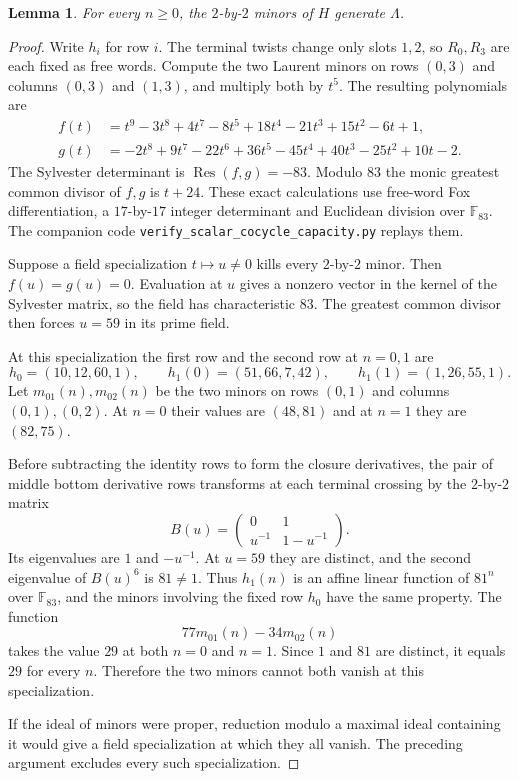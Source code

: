\documentclass[11pt]{article}
\newtheorem{lemma}[theorem]{Lemma}
\newcommand{\F}{\mathbb F}
\begin{document}
\begin{lemma}\label{lem:minors}
For every $n\ge0$, the $2$-by-$2$ minors of $H$ generate $\Lambda$.
\end{lemma}
\begin{proof}
Write $h_i$ for row $i$. The terminal twists change only slots $1,2$,
so $R_0,R_3$ are each fixed as free words. Compute the two Laurent
minors on rows $(0,3)$ and columns $(0,3)$ and $(1,3)$, and multiply
both by $t^5$. The resulting polynomials are
\begin{align*}
 f(t)&=t^9-3t^8+4t^7-8t^5+18t^4-21t^3+15t^2-6t+1,\\
 g(t)&=-2t^8+9t^7-22t^6+36t^5-45t^4+40t^3-25t^2+10t-2.
\end{align*}
The Sylvester determinant is $\operatorname{Res}(f,g)=-83$. Modulo
$83$ the monic greatest common divisor of $f,g$ is $t+24$.
These exact calculations use free-word Fox differentiation, a
$17$-by-$17$ integer determinant and Euclidean division over $\F_{83}$.
The companion code \texttt{verify\_scalar\_cocycle\_capacity.py}
replays them.

Suppose a field specialization $t\mapsto u\ne0$ kills every
$2$-by-$2$ minor. Then $f(u)=g(u)=0$. Evaluation at $u$ gives a
nonzero vector in the kernel of the Sylvester matrix, so the field
has characteristic $83$. The greatest common divisor then forces
$u=59$ in its prime field.

At this specialization the first row and the second row at $n=0,1$
are
\[
 h_0=(10,12,60,1),\qquad h_1(0)=(51,66,7,42),\qquad
 h_1(1)=(1,26,55,1).
\]
Let $m_{01}(n),m_{02}(n)$ be the two minors on rows $(0,1)$ and
columns $(0,1),(0,2)$. At $n=0$ their values are $(48,81)$ and at
$n=1$ they are $(82,75)$.

Before subtracting the identity rows to form the closure derivatives,
the pair of middle bottom derivative rows transforms at each terminal
crossing by the $2$-by-$2$ matrix
\[
 B(u)=\begin{pmatrix}0&1\\ u^{-1}&1-u^{-1}\end{pmatrix}.
\]
Its eigenvalues are $1$ and $-u^{-1}$. At $u=59$ they are distinct,
and the second eigenvalue of $B(u)^6$ is $81\ne1$. Thus $h_1(n)$
is an affine linear function of $81^n$ over $\F_{83}$, and the
minors involving the fixed row $h_0$ have the same property.
The function
\[
                   77m_{01}(n)-34m_{02}(n)
\]
takes the value $29$ at both $n=0$ and $n=1$. Since $1$ and $81$ are
distinct, it equals $29$ for every $n$. Therefore the two minors cannot
both vanish at this specialization.

If the ideal of minors were proper, reduction modulo a maximal ideal
containing it would give a field specialization at which they all
vanish. The preceding argument excludes every such specialization.
\end{proof}
\end{document}
